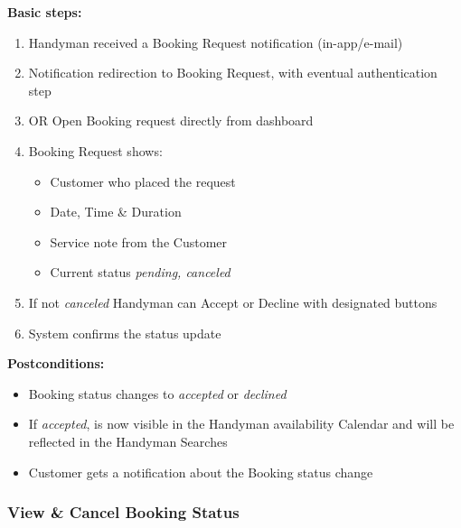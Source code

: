 \documentclass[11pt,a4paper]{article}
\begin{document}
\textbf{Basic steps:}
\begin{enumerate}
\item Handyman received a Booking Request notification (in-app/e-mail)
\item Notification redirection to Booking Request, with eventual authentication step
\item OR Open Booking request directly from dashboard
\item Booking Request shows:
  \begin{itemize}
  \item Customer who placed the request
  \item Date, Time \& Duration
  \item Service note from the Customer
  \item Current status \textit{pending, canceled}
  \end{itemize}
\item If not \textit{canceled} Handyman can Accept or Decline with designated buttons
\item System confirms the status update
\end{enumerate}
\textbf{Postconditions:}
\begin{itemize}
\item Booking status changes to \textit{accepted} or \textit{declined}
\item If \textit{accepted}, is now visible in the Handyman availability Calendar and will be reflected in the Handyman Searches
\item Customer gets a notification about the Booking status change
\end{itemize}


\subsubsection{View \& Cancel Booking Status}
\end{document}
